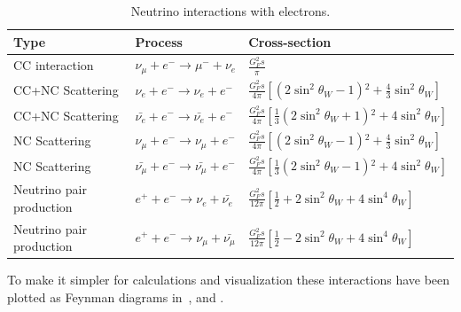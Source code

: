 \begin{table}[h!]
\centering
\caption{Neutrino interactions with electrons.}
\label{tab:electronproc}
\begin{tabular}{|l|l|l|}
 \hline
Type & Process & Cross-section \\
 \hline
CC interaction & $\nu_\mu + e^- \rightarrow \mu^- + \nu_e$  & $\frac{G_F^2 s}{\pi}$\\
CC+NC Scattering & $\nu_e + e^- \rightarrow \nu_e + e^-$ & $\frac{G_F^2 s}{4\pi} \left[ (2\sin^2 \theta_W -1){}^2 +\frac{4}{3}\sin^2 \theta_W \right]$\\ 
CC+NC Scattering & $\bar{\nu_e} + e^- \rightarrow \bar{\nu_e} + e^-$ & $\frac{G_F^2 s}{4\pi} \left[ \frac{1}{3}(2\sin^2 \theta_W +1){}^2 +4\sin^2 \theta_W \right]$ \\
NC Scattering & $\nu_\mu + e^- \rightarrow \nu_\mu + e^-$ & $\frac{G_F^2 s}{4\pi} \left[ (2\sin^2 \theta_W -1){}^2 +\frac{4}{3}\sin^2 \theta_W \right]$ \\
NC Scattering & $\bar{\nu_\mu} + e^- \rightarrow \bar{\nu_\mu} + e^-$ &$\frac{G_F^2 s}{4\pi} \left[ \frac{1}{3}(2\sin^2 \theta_W -1){}^2 +4\sin^2 \theta_W \right]$ \\
Neutrino pair production & $e^+ + e^- \rightarrow \nu_e + \bar{\nu_e}$ & $\frac{G_F^2 s}{12\pi} \left[ \frac{1}{2} + 2\sin^2 \theta_W + 4\sin^4 \theta_W \right]$ \\
Neutrino pair production & $e^+ + e^- \rightarrow \nu_\mu + \bar{\nu_\mu}$ & $\frac{G_F^2 s}{12\pi} \left[ \frac{1}{2} - 2\sin^2 \theta_W + 4\sin^4 \theta_W \right]$ \\
 \hline
\end{tabular}
\end{table}

To make it simpler for calculations and visualization these interactions have been plotted as Feynman diagrams in~,  and .

